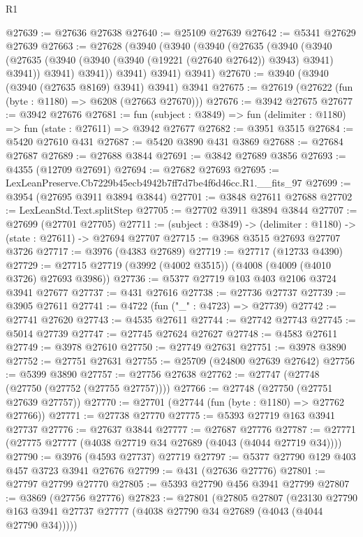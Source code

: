 \begin{lexlean}{R1}
\begin{coremodule}
@27639 := @27636 @27638
@27640 := @25109 @27639
@27642 := @5341 @27629 @27639
@27663 := @27628
    (@3940
      (@3940
        (@3940
          (@27635
            (@3940
              (@3940
                (@27635 (@3940 (@3940 (@3940 (@19221 (@27640 @27642)) @3943) @3941) @3941))
                @3941)
              @3941))
          @3941)
        @3941)
      @3941)
@27670 := @3940 (@3940 (@3940 (@27635 @8169) @3941) @3941) @3941
@27675 := @27619 (@27622 (fun (byte : @1180) => @6208 (@27663 @27670)))
@27676 := @3942 @27675
@27677 := @3942 @27676
@27681 := fun (subject : @3849) => fun (delimiter : @1180) => fun (state : @27611) => @3942 @27677
@27682 := @3951 @3515
@27684 := @5420 @27610 @431
@27687 := @5420 @3890 @431 @3869
@27688 := @27684 @27687
@27689 := @27688 @3844
@27691 := @3842 @27689 @3856
@27693 := @4355 (@12709 @27691)
@27694 := @27682 @27693
@27695 := LexLeanPreserve.Cb7229b45ecb4942b7ff7d7be4f6d46cc.R1.__fits_97
@27699 := @3954 (@27695 @3911 @3894 @3844)
@27701 := @3848 @27611 @27688
@27702 := LexLeanStd.Text.splitStep
@27705 := @27702 @3911 @3894 @3844
@27707 := @27699 (@27701 @27705)
@27711 := (subject : @3849) -> (delimiter : @1180) -> (state : @27611) -> @27694 @27707
@27715 := @3968 @3515 @27693 @27707 @3726
@27717 := @3976 (@4383 @27689)
@27719 := @27717 (@12733 @4390)
@27729 := @27715 @27719 (@3992 (@4002 @3515)) (@4008 (@4009 (@4010 @3726) @27693 @3986))
@27736 := @5377 @27719 @103 @403 @2106 @3724 @3941 @27677
@27737 := @431 @27616
@27738 := @27736 @27737
@27739 := @3905 @27611
@27741 := @4722 (fun ("_" : @4723) => @27739)
@27742 := @27741 @27620
@27743 := @4535 @27611
@27744 := @27742 @27743
@27745 := @5014 @27739
@27747 := @27745 @27624 @27627
@27748 := @4583 @27611
@27749 := @3978 @27610
@27750 := @27749 @27631
@27751 := @3978 @3890
@27752 := @27751 @27631
@27755 := @25709 (@24800 @27639 @27642)
@27756 := @5399 @3890
@27757 := @27756 @27638
@27762 := @27747 (@27748 (@27750 (@27752 (@27755 @27757))))
@27766 := @27748 (@27750 (@27751 @27639 @27757))
@27770 := @27701 (@27744 (fun (byte : @1180) => @27762 @27766))
@27771 := @27738 @27770
@27775 := @5393 @27719 @163 @3941 @27737
@27776 := @27637 @3844
@27777 := @27687 @27776
@27787 := @27771 (@27775 @27777 (@4038 @27719 @34 @27689 (@4043 (@4044 @27719 @34))))
@27790 := @3976 (@4593 @27737) @27719
@27797 := @5377 @27790 @129 @403 @457 @3723 @3941 @27676
@27799 := @431 (@27636 @27776)
@27801 := @27797 @27799 @27770
@27805 := @5393 @27790 @456 @3941 @27799
@27807 := @3869 (@27756 @27776)
@27823 := @27801
    (@27805
      @27807
      (@23130 @27790 @163 @3941 @27737 @27777 (@4038 @27790 @34 @27689 (@4043 (@4044 @27790 @34)))))

\end{coremodule}
\end{lexlean}
